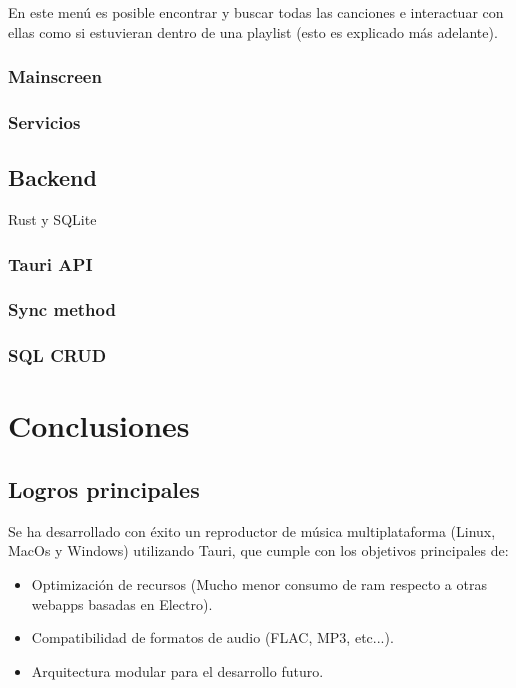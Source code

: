 \documentclass[11pt, a4paper]{article}
\begin{document}
                En este menú es posible encontrar y buscar todas las canciones e interactuar con ellas como si estuvieran dentro de una playlist (esto es explicado más adelante).



            \subsubsection{Mainscreen}

            

            \subsubsection{Servicios}

        \subsection{Backend}

        Rust y SQLite

            \subsubsection{Tauri API}

            \subsubsection{Sync method}

            \subsubsection{SQL CRUD}


\section{Conclusiones}

        \subsection{Logros principales}

        Se ha desarrollado con éxito un reproductor de música multiplataforma (Linux, MacOs y Windows) utilizando Tauri, que cumple con los objetivos principales de:

        \begin{itemize}
            \item Optimización de recursos (Mucho menor consumo de ram respecto a otras webapps basadas en Electro).
            \item Compatibilidad de formatos de audio (FLAC, MP3, etc...).
            \item Arquitectura modular para el desarrollo futuro.
        \end{itemize}
\end{document}
